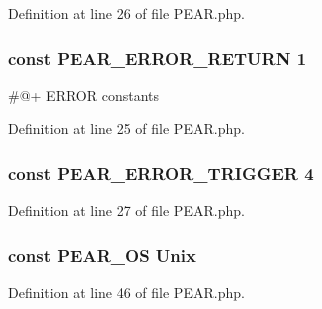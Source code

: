 Definition at line 26 of file P\+E\+A\+R.\+php.

\hypertarget{PEAR_8php_a90d8915cb5b94d81cd4e1efa9c75c66a}{}
\subsubsection[{P\+E\+A\+R\+\_\+\+E\+R\+R\+O\+R\+\_\+\+R\+E\+T\+U\+R\+N}]{\setlength{\rightskip}{0pt plus 5cm}const P\+E\+A\+R\+\_\+\+E\+R\+R\+O\+R\+\_\+\+R\+E\+T\+U\+R\+N 1}\label{PEAR_8php_a90d8915cb5b94d81cd4e1efa9c75c66a}
\#@+ E\+R\+R\+O\+R constants 

Definition at line 25 of file P\+E\+A\+R.\+php.

\hypertarget{PEAR_8php_a23a071419e1d6bbb554976e21d978d56}{}
\subsubsection[{P\+E\+A\+R\+\_\+\+E\+R\+R\+O\+R\+\_\+\+T\+R\+I\+G\+G\+E\+R}]{\setlength{\rightskip}{0pt plus 5cm}const P\+E\+A\+R\+\_\+\+E\+R\+R\+O\+R\+\_\+\+T\+R\+I\+G\+G\+E\+R 4}\label{PEAR_8php_a23a071419e1d6bbb554976e21d978d56}


Definition at line 27 of file P\+E\+A\+R.\+php.

\hypertarget{PEAR_8php_a5fd2c8f5bc659f777ab39b8bfd745c4c}{}
\subsubsection[{P\+E\+A\+R\+\_\+\+O\+S}]{\setlength{\rightskip}{0pt plus 5cm}const P\+E\+A\+R\+\_\+\+O\+S \textquotesingle{}Unix\textquotesingle{}}\label{PEAR_8php_a5fd2c8f5bc659f777ab39b8bfd745c4c}


Definition at line 46 of file P\+E\+A\+R.\+php.

